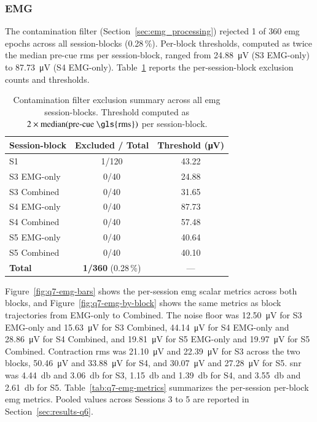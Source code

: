 \FloatBarrier

\subsubsection{EMG}
\label{sec:results-q7-emg}

The contamination filter (Section~\ref{sec:emg_processing}) rejected \num{1} of \num{360} \gls{emg} epochs across all session-blocks (\num{0.28}\,\%). Per-block thresholds, computed as twice the median pre-cue \gls{rms} per session-block, ranged from \SI{24.88}{\micro\volt} (S3 EMG-only) to \SI{87.73}{\micro\volt} (S4 EMG-only). Table~\ref{tab:q7-qc-filter} reports the per-session-block exclusion counts and thresholds. 

\begin{table}[!htbp]
  \centering
  \caption{Contamination filter exclusion summary across all \gls{emg} session-blocks. Threshold computed as $2 \times \operatorname{median}(\text{pre-cue \gls{rms}})$ per session-block.}
  \label{tab:q7-qc-filter}
  \begin{tabular}{l c c}
    \toprule
    \textbf{Session-block} & \textbf{Excluded / Total} & \textbf{Threshold (\si{\micro\volt})} \\
    \midrule
    S1            & \num{1}/\num{120} & \num{43.22} \\
    \addlinespace
    S3 EMG-only   & \num{0}/\num{40}  & \num{24.88} \\
    S3 Combined   & \num{0}/\num{40}  & \num{31.65} \\
    S4 EMG-only   & \num{0}/\num{40}  & \num{87.73} \\
    S4 Combined   & \num{0}/\num{40}  & \num{57.48} \\
    S5 EMG-only   & \num{0}/\num{40}  & \num{40.64} \\
    S5 Combined   & \num{0}/\num{40}  & \num{40.10} \\
    \midrule
    \textbf{Total} & \textbf{\num{1}/\num{360}} (\num{0.28}\,\%) & --- \\
    \bottomrule
  \end{tabular}
\end{table}

Figure~\ref{fig:q7-emg-bars} shows the per-session \gls{emg} scalar metrics across both blocks, and Figure~\ref{fig:q7-emg-by-block} shows the same metrics as block trajectories from EMG-only to Combined. The noise floor was \SI{12.50}{\micro\volt} for S3 EMG-only and \SI{15.63}{\micro\volt} for S3 Combined, \SI{44.14}{\micro\volt} for S4 EMG-only and \SI{28.86}{\micro\volt} for S4 Combined, and \SI{19.81}{\micro\volt} for S5 EMG-only and \SI{19.97}{\micro\volt} for S5 Combined. Contraction \gls{rms} was \SI{21.10}{\micro\volt} and \SI{22.39}{\micro\volt} for S3 across the two blocks, \SI{50.46}{\micro\volt} and \SI{33.88}{\micro\volt} for S4, and \SI{30.07}{\micro\volt} and \SI{27.28}{\micro\volt} for S5. \gls{snr} was \SI{4.44}{\decibel} and \SI{3.06}{\decibel} for S3, \SI{1.15}{\decibel} and \SI{1.39}{\decibel} for S4, and \SI{3.55}{\decibel} and \SI{2.61}{\decibel} for S5. Table~\ref{tab:q7-emg-metrics} summarizes the per-session per-block \gls{emg} metrics. Pooled values across Sessions 3 to 5 are reported in Section~\ref{sec:results-q6}.

